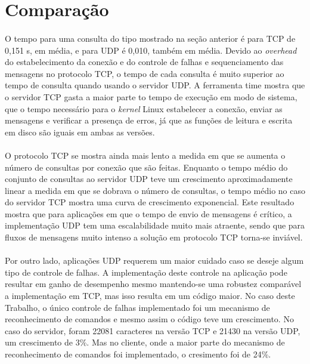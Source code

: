 \documentclass[a4paper,10pt,oneside,final,titlepage,onecolumn]{scrartcl}
\begin{document}
\section{Comparação}
\paragraph{}O tempo para uma consulta do tipo mostrado na seção anterior é para TCP de 0,151 s, em média, e para UDP é 0,010, também em média. Devido ao \emph{overhead} do estabelecimento da conexão e do controle de falhas e sequenciamento das mensagens no protocolo TCP, o tempo de cada consulta é muito superior ao tempo de consulta quando usando o servidor UDP. A ferramenta time mostra que o servidor TCP gasta a maior parte to tempo de execução em modo de sistema, que o tempo necessário para o \emph{kernel} Linux estabelecer a conexão, enviar as mensagens e verificar a presença de erros, já que as funções de leitura e escrita em disco são iguais em ambas as versões.
\paragraph{}O protocolo TCP se mostra ainda mais lento a medida em que se aumenta o número de consultas por conexão que são feitas. Enquanto o tempo médio do conjunto de consultas ao servidor UDP teve um crescimento aproximadamente linear a medida em que se dobrava o número de consultas, o tempo médio no caso do servidor TCP mostra uma curva de crescimento exponencial. Este resultado mostra que para aplicações em que o tempo de envio de mensagens é crítico, a implementação UDP tem uma escalabilidade muito mais atraente, sendo que para fluxos de mensagens muito intenso a solução em protocolo TCP torna-se inviável.
\paragraph{}Por outro lado, aplicações UDP requerem um maior cuidado caso se deseje algum tipo de controle de falhas. A implementação deste controle na aplicação pode resultar em ganho de desempenho mesmo mantendo-se uma robustez comparável a implementação em TCP, mas isso resulta em um código maior. No caso deste Trabalho, o único controle de falhas implementado foi um mecanismo de reconhecimento de comandos e mesmo assim o código teve um crescimento. No caso do servidor, foram 22081 caracteres na versão TCP e 21430 na versão UDP, um crescimento de 3\%. Mas no cliente, onde a maior parte do mecanismo de reconhecimento de comandos foi implementado, o cresimento foi de 24\%.
\end{document}

